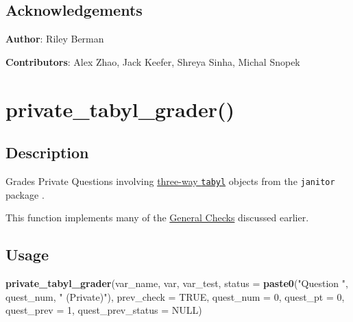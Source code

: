 \documentclass[
  12pt,
]{book}
\newenvironment{Shaded}{\begin{snugshade}}{\end{snugshade}}
\newcommand{\AttributeTok}[1]{\textcolor[rgb]{0.13,0.29,0.53}{#1}}
\newcommand{\ConstantTok}[1]{\textcolor[rgb]{0.56,0.35,0.01}{#1}}
\newcommand{\DecValTok}[1]{\textcolor[rgb]{0.00,0.00,0.81}{#1}}
\newcommand{\FunctionTok}[1]{\textcolor[rgb]{0.13,0.29,0.53}{\textbf{#1}}}
\newcommand{\NormalTok}[1]{#1}
\newcommand{\StringTok}[1]{\textcolor[rgb]{0.31,0.60,0.02}{#1}}
\begin{document}
\subsection*{Acknowledgements}\label{acknowledgements-1}

\textbf{Author}: Riley Berman

\textbf{Contributors}: Alex Zhao, Jack Keefer, Shreya Sinha, Michal Snopek

\section{private\_tabyl\_grader()}\label{private_tabyl_grader}

\subsection*{Description}\label{description-2}

Grades Private Questions involving \hyperref[three-way_tabyl]{three-way \texttt{tabyl}} objects from the \texttt{janitor} package \citep{R-janitor}.

This function implements many of the \hyperref[General-Checks]{General Checks} discussed earlier.

\subsection*{Usage}\label{usage-2}

\begin{Shaded}
\begin{Highlighting}[]
\FunctionTok{private\_tabyl\_grader}\NormalTok{(var\_name, }
\NormalTok{                     var, }
\NormalTok{                     var\_test, }
                     \AttributeTok{status =} \FunctionTok{paste0}\NormalTok{(}\StringTok{"Question "}\NormalTok{, quest\_num, }\StringTok{" (Private)"}\NormalTok{), }
                     \AttributeTok{prev\_check =} \ConstantTok{TRUE}\NormalTok{, }
                     \AttributeTok{quest\_num =} \DecValTok{0}\NormalTok{, }
                     \AttributeTok{quest\_pt =} \DecValTok{0}\NormalTok{, }
                     \AttributeTok{quest\_prev =} \DecValTok{1}\NormalTok{, }
                     \AttributeTok{quest\_prev\_status =} \ConstantTok{NULL}\NormalTok{)}
\end{Highlighting}
\end{Shaded}
\end{document}
